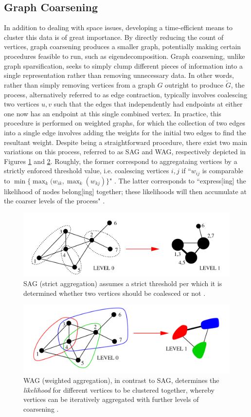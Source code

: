 \documentclass{article}
\begin{document}
\subsection{Graph Coarsening}\label{coarsening-bg}
In addition to dealing with space issues, developing a time-efficient means to cluster this data is of great importance. By directly reducing the count of vertices, graph coarsening produces a smaller graph, potentially making certain procedures feasible to run, such as eigendecomposition. Graph coarsening, unlike graph sparsification, seeks to simply clump different pieces of information into a single representation rather than removing unnecessary data. In other words, rather than simply removing vertices from a graph $G$ outright to produce $\widetilde{G}$, the process, alternatively referred to as edge contraction, typically involves coalescing two vertices $u,v$ such that the edges that independently had endpoints at either one now has an endpoint at this single combined vertex. In practice, this procedure is performed on weighted graphs, for which the collection of two edges into a single edge involves adding the weights for the initial two edges to find the resultant weight. Despite being a straightforward procedure, there exist two main variations on this process, referred to as SAG and WAG, respectively depicted in Figures \ref{fig:sag} and  \ref{fig:wag}. Roughly, the former correspond to aggregataing vertices by a strictly enforced threshold value, i.e. coalescing vertices $i,j$ if ``$w_{ij}$ is comparable to $\min\{\max_k(w_{ik}, \max_k(w_{kj})\}$" \cite{coarsening}. The latter corresponds to ``express[ing]  the likelihood of nodes belong[ing] together; these likelihoods will then accumulate at the coarser levels of the process" \cite{coarsening}. 

\begin{figure}
    \label{fig:sag}
    \centering
    \includegraphics[width=.60\textwidth]{sag.png}
    \caption[SAG Coarsening]{SAG (strict aggregation) assumes a strict threshold per which it is determined whether two vertices should be coalesced or not \cite{coarsening}.}
\end{figure}

\begin{figure}
    \label{fig:wag}
    \centering
    \includegraphics[width=.60\textwidth]{wag.png}
    \caption[WAG Coarsening]{WAG (weighted aggregation), in contrast to SAG, determines the \textit{likelihood} for different vertices to be clustered together, whereby vertices can be iteratively aggregated with further levels of coarsening \cite{coarsening}.}
\end{figure}
\end{document}

